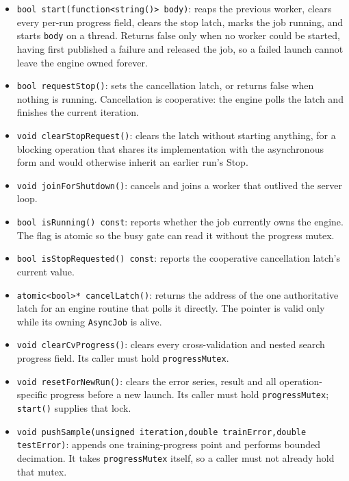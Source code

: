 \begin{itemize}
\item \texttt{bool start(function<string()> body)}: reaps the previous worker,
      clears every per-run progress field, clears the stop latch, marks the job
      running, and starts \texttt{body} on a thread.  Returns false only when no
      worker could be started, having first published a failure and released the
      job, so a failed launch cannot leave the engine owned forever.
\item \texttt{bool requestStop()}: sets the cancellation latch, or returns false
      when nothing is running.  Cancellation is cooperative: the engine polls
      the latch and finishes the current iteration.
\item \texttt{void clearStopRequest()}: clears the latch without starting
      anything, for a blocking operation that shares its implementation with the
      asynchronous form and would otherwise inherit an earlier run's Stop.
\item \texttt{void joinForShutdown()}: cancels and joins a worker that outlived
      the server loop.
\item \texttt{bool isRunning() const}: reports whether the job currently owns
      the engine.  The flag is atomic so the busy gate can read it without the
      progress mutex.
\item \texttt{bool isStopRequested() const}: reports the cooperative
      cancellation latch's current value.
\item \texttt{atomic<bool>* cancelLatch()}: returns the address of the one
      authoritative latch for an engine routine that polls it directly.  The
      pointer is valid only while its owning \texttt{AsyncJob} is alive.
\item \texttt{void clearCvProgress()}: clears every cross-validation and nested
      search progress field.  Its caller must hold \texttt{progressMutex}.
\item \texttt{void resetForNewRun()}: clears the error series, result and all
      operation-specific progress before a new launch.  Its caller must hold
      \texttt{progressMutex}; \texttt{start()} supplies that lock.
\item \texttt{void pushSample(unsigned iteration,double trainError,double
      testError)}: appends one training-progress point and performs bounded
      decimation.  It takes \texttt{progressMutex} itself, so a caller must not
      already hold that mutex.
\end{itemize}

